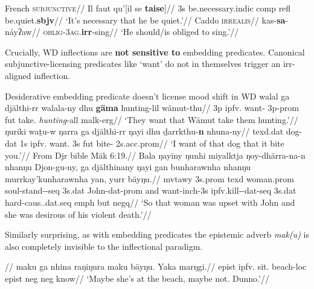 \pex\a\begingl\glpreamble French \textsc{subjunctive}//
\gla Il faut qu'[il se \textbf{taise}]//
\glb 3s be.necessary.\gls{indic} \gls{comp} \gls{refl} be.quiet.\textbf{\gls{sbjv}}//
\glft`It's necessary that he be quiet.'//\endgl
\a\begingl\glpreamble Caddo \textsc{irrealis}//
\gla kas-\textbf{sa}-náyʔaw//
\glb \textsc{oblig}-3\textsc{ag}.\textbf{\gls{irr}}-sing//
\glft`He should/is obliged to sing.'//\endgl
\xe


Crucially, WD inflections are \textbf{not sensitive to} embedding predicates. Canonical subjunctive-licensing predicates like `want' do not in themselves trigger an \gls{irr}-aligned inflection.

\pex Desiderative embedding predicate doesn't license mood shift in WD
\a\begingl\gla walal ga djälthi-rr walala-ny dhu \textbf{gäma} hunting-lil wämut-thu//
\glb 3p \gls{ipfv}.\I{} want-\I{} 3p-\gls{prom} \gls{fut} take.\I{} \textit{hunting}-\gls{all} \gls{malk}-\gls{erg}//
\glft`They want that Wämut take them hunting.'//\endgl
\a\begingl\gla ŋuriki waṯu-w ŋarra ga djälthi-rr ŋayi dhu ḏarrkthu-\textbf{n} nhuna-ny//
\glb \gls{texd}.\gls{dat} dog-\gls{dat} 1s \gls{ipfv}.\I{} want.\I{} 3s \gls{fut} bite-\I{} 2s.\gls{acc}.\gls{prom}//
\glft`I want of that dog that it bite you.'//\endgl{}
\a\begingl\glpreamble From Djr bible Mäk 6:19.//
\gla Bala ŋayiny ŋunhi miyalktja ŋoy-dhärra-na-n nhanŋu Djon-gu-ny, ga djälthinany ŋayi gan bunharawnha nhanŋu murrkay'kunharawnha yan, yurr bäyŋu.//
\glb \gls{mvtawy} 3s.\gls{prom} \gls{texd} woman.\gls{prom} soul-stand-\III-\gls{seq} 3s.\gls{dat} John-\gls{dat}-\gls{prom} and want-\gls{inch}-\III 3s \gls{ipfv}.\III kill-\IV-\gls{dat}-\gls{seq} 3s.\gls{dat} hard-\gls{caus}.\IV.\gls{dat}.\gls{seq} \gls{emph} but \gls{negq}//
\glft`So that woman was upset with John and she was desirous of his violent death.'//\endgl
\xe


Similarly surprising, as with embedding predicates the epistemic adverb \textit{mak(u)} is also completely invisible to the inflectional paradigm.

\pex
\begingl{}//
\gla maku ga nhina raŋiŋura maku bäyŋu. Yaka marŋgi.//
\glb \gls{epist} \gls{ipfv}.\I{} sit.\I{} beach-\gls{loc} \gls{epist} \gls{neg} \gls{neg} know//
\glft`Maybe she's at the beach, maybe not. Dunno.'\trailingcitation{[DB~20191416]}//\endgl
\xe

